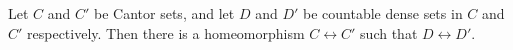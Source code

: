 Let $C$ and $C'$ be Cantor sets, and let $D$ and $D'$ be countable dense sets in $C$ and $C'$ respectively. Then there is a homeomorphism $C \leftrightarrow C'$ such that $D \leftrightarrow D'$.
